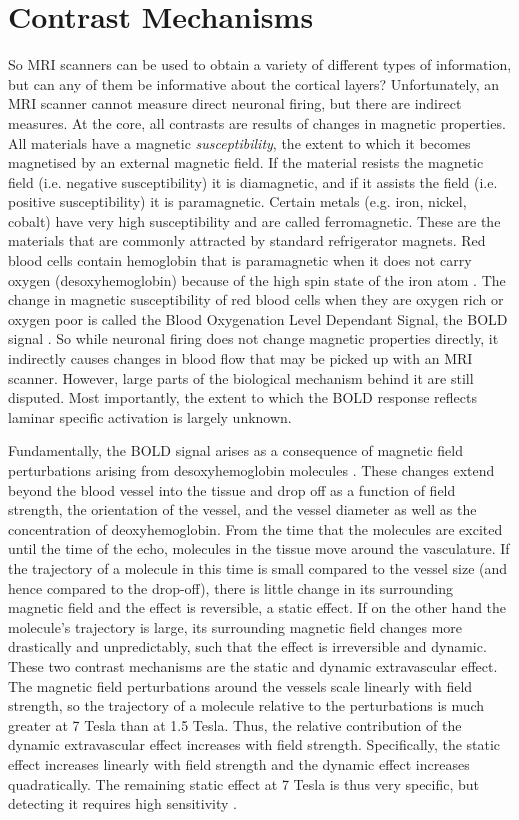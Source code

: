 \section*{Contrast Mechanisms}
So MRI scanners can be used to obtain a variety of different types of information, but can any of them be informative about the cortical layers? Unfortunately, an MRI scanner cannot measure direct neuronal firing, but there are indirect measures. At the core, all contrasts are results of changes in magnetic properties. All materials have a magnetic \emph{susceptibility}, the extent to which it becomes magnetised by an external magnetic field. If the material resists the magnetic field (i.e. negative susceptibility) it is diamagnetic, and if it assists the field (i.e. positive susceptibility) it is paramagnetic. Certain metals (e.g. iron, nickel, cobalt) have very high susceptibility and are called ferromagnetic. These are the materials that are commonly attracted by standard refrigerator magnets. Red blood cells contain hemoglobin that is paramagnetic when it does not carry oxygen (desoxyhemoglobin) because of the high spin state of the iron atom \cite{Pauling1936}. The change in magnetic susceptibility of red blood cells when they are oxygen rich or oxygen poor is called the Blood Oxygenation Level Dependant Signal, the BOLD signal \cite{Ogawa1990}. So while neuronal firing does not change magnetic properties directly, it indirectly causes changes in blood flow that may be picked up with an MRI scanner. However, large parts of the biological mechanism behind it are still disputed. Most importantly, the extent to which the BOLD response reflects laminar specific activation is largely unknown.

Fundamentally, the BOLD signal arises as a consequence of magnetic field perturbations arising from desoxyhemoglobin molecules \cite{Norris2006}. These changes extend beyond the blood vessel into the tissue and drop off as a function of field strength, the orientation of the vessel, and the vessel diameter as well as the concentration of deoxyhemoglobin. From the time that the molecules are excited until the time of the echo, molecules in the tissue move around the vasculature. If the trajectory of a molecule in this time is small compared to the vessel size (and hence compared to the drop-off), there is little change in its surrounding magnetic field and the effect is reversible, a static effect. If on the other hand the molecule's trajectory is large, its surrounding magnetic field changes more drastically and unpredictably, such that the effect is irreversible and dynamic. These two contrast mechanisms are the static and dynamic extravascular effect. The magnetic field perturbations around the vessels scale linearly with field strength, so the trajectory of a molecule relative to the perturbations is much greater at 7 Tesla than at 1.5 Tesla. Thus, the relative contribution of the dynamic extravascular effect increases with field strength. Specifically, the static effect increases linearly with field strength and the dynamic effect increases quadratically. The remaining static effect at 7 Tesla is thus very specific, but detecting it requires high sensitivity \cite{Panchuelo2014}. 

